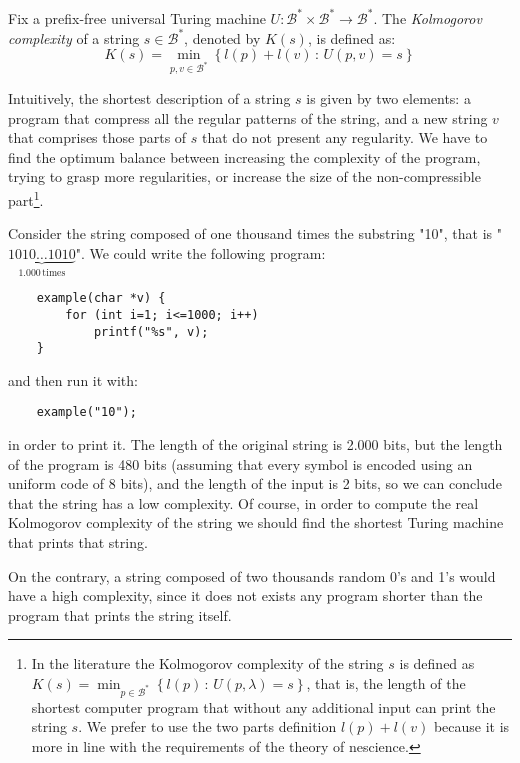 \begin{definition}
\label{def:Kolmogorov-Complexity}
Fix a prefix-free universal Turing machine $U:\mathcal{B}^\ast \times \mathcal{B}^\ast \rightarrow \mathcal{B}^\ast$. The \emph{Kolmogorov complexity} of a string $s \in \mathcal{B}^\ast$, denoted by $K(s)$, is defined as:
\[
K(s)=\min_{p,v \in \mathcal{B}^\ast}\left\{l(p) + l(v)\,:\, U(p,v)=s\right\}
\]
\end{definition}

Intuitively, the shortest description of a string $s$ is given by two elements: a program that compress all the regular patterns of the string, and a new string $v$ that comprises those parts of $s$ that do not present any regularity. We have to find the optimum balance between increasing the complexity of the program, trying to grasp more regularities, or increase the size of the non-compressible part\footnote{In the literature the Kolmogorov complexity of the string $s$ is defined as $K(s)=\min_{p \in \mathcal{B}^\ast}\left\{l(p)\,:\, U(p,\lambda)=s\right\}$, that is, the length of the shortest computer program that without any additional input can print the string $s$. We prefer to use the two parts definition $l(p) + l(v)$ because it is more in line with the requirements of the theory of nescience.}.

\begin{example}
Consider the string composed of one thousand times the substring "10", that is "$\underbrace{1010\ldots1010}_{1.000\,\mathrm{times}}$". We could write the following program:

\begin{verbatim}
    example(char *v) {
        for (int i=1; i<=1000; i++)
            printf("%s", v);
    }
\end{verbatim}
and then run it with:
\begin{verbatim}
    example("10");
\end{verbatim}

in order to print it. The length of the original string is 2.000 bits, but the length of the program is 480 bits (assuming that every symbol is encoded using an uniform code of 8 bits), and the length of the input is 2 bits, so we can conclude that the string has a low complexity. Of course, in order to compute the real Kolmogorov complexity of the string we should find the shortest Turing machine that prints that string.

On the contrary, a string composed of two thousands random 0's and 1's would have a high complexity, since it does not exists any program shorter than the program that prints the string itself.
\end{example}

